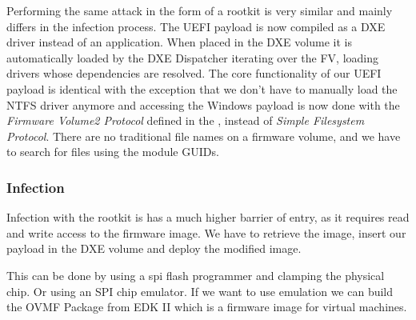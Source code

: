 Performing the same attack in the form of a rootkit is very similar and mainly differs in the infection process.
The \ac{UEFI} payload is now compiled as a \ac{DXE} driver instead of an application.
When placed in the \ac{DXE} volume it is automatically loaded by the \ac{DXE} Dispatcher iterating over the \ac{FV}, loading  drivers whose dependencies are resolved.
The core functionality of our \ac{UEFI} payload is identical with the exception that we don't have to manually load the \ac{NTFS} driver anymore and accessing the Windows payload is now done with the \emph{Firmware Volume2 Protocol} defined in the \cite[3.4.1]{pi-spec}, instead of \emph{Simple Filesystem Protocol}. There are no traditional file names on a firmware volume, and we have to search for files using the module \acp{GUID}.

\subsubsection{Infection}

Infection with the rootkit is has a much higher barrier of entry, as it requires read and write access to the firmware image.
We have to retrieve the image, insert our payload in the \ac{DXE} volume and deploy the modified image.

This can be done by using a spi flash programmer and clamping the physical chip.
Or using an SPI chip emulator.
If we want to use emulation we can build the \ac{OVMF} Package from EDK II which is a firmware image for virtual machines.

